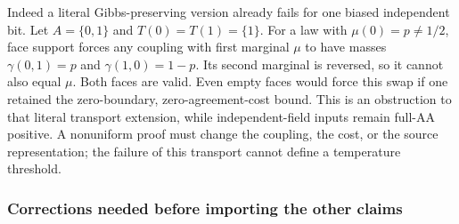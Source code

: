 Indeed a literal Gibbs-preserving version already fails for one biased
independent bit. Let $A=\{0,1\}$ and $T(0)=T(1)=\{1\}$. For a law
with $\mu(0)=p\ne1/2$, face support forces any coupling with first
marginal $\mu$ to have masses $\gamma(0,1)=p$ and
$\gamma(1,0)=1-p$. Its second marginal is reversed, so it cannot also
equal $\mu$. Both faces are valid. Even empty faces would force this
swap if one retained the zero-boundary, zero-agreement-cost bound.
This is an obstruction to that literal transport extension, while
independent-field inputs remain full-AA positive. A nonuniform proof
must change the coupling, the cost, or the source representation; the
failure of this transport cannot define a temperature threshold.

\subsubsection{Corrections needed before importing the other claims}


